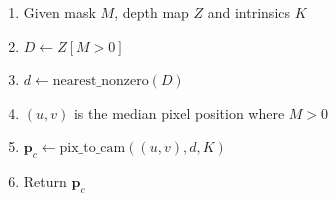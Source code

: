 \begin{enumerate}
    \item Given mask $M$, depth map $Z$ and intrinsics $K$
    \item $D \gets Z[M>0]$
    \item $d \gets \text{nearest\_nonzero}(D)$
    \item $(u,v)$ is the median pixel position where $M>0$
    \item $\mathbf{p}_c \gets \text{pix\_to\_cam}((u,v), d, K)$
    \item Return $\mathbf{p}_c$
\end{enumerate}
